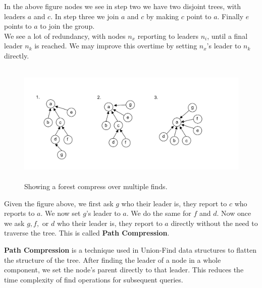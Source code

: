 \noindent
In the above figure nodes we see in step two we have two disjoint trees, with leaders $a$ and $c$. In step three we join $a$ and $c$ by making $c$ point to $a$. Finally $e$ points to $a$ to join the group.\\

\noindent
We see a lot of redundancy, with nodes $n_x$ reporting to leaders $n_i$, until a final leader $n_k$ is reached. We may improve this overtime by setting $n_x$'s leader to $n_k$ directly.\\

\vspace{-3em}
\begin{figure}[h]
    \centering
    \includegraphics[height=2.3in]{./Sections/spanning/path_compression.png}
    
    \vspace{-1em}
    \caption{Showing a forest compress over multiple finds.}
    \label{fig:path_compression}
\end{figure}
\noindent
Given the figure above, we first ask $g$ who their leader is, they report to $c$ who reports to $a$. We now set $g$'s leader to $a$. We do the same for $f$ and $d$. Now once
we ask $g,f,$ or $d$ who their leader is, they report to $a$ directly without the need to traverse the tree. This is called \textbf{Path Compression}.
\begin{Def}

    \textbf{Path Compression} is a technique used in Union-Find data structures to flatten the structure of the tree. 
    After finding the leader of a node in a whole component, we set the node's parent directly to that leader. This reduces the time complexity of find operations for subsequent queries.
\end{Def}

